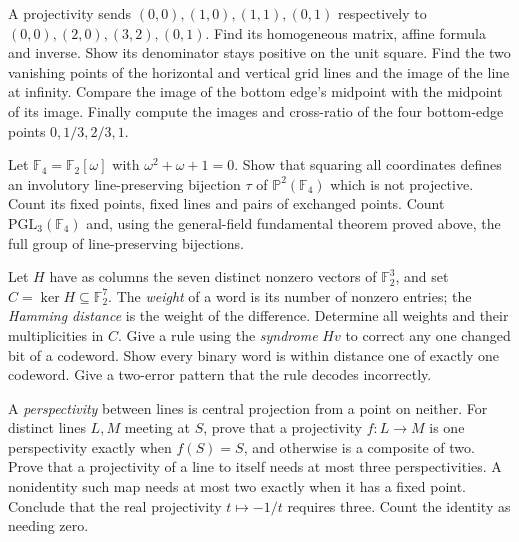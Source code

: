 \begin{exercise}[$\star\star$]\label{ex:v9-keystone-calibration}
A projectivity sends $(0,0),(1,0),(1,1),(0,1)$ respectively to $(0,0),(2,0),(3,2),(0,1)$. Find its homogeneous matrix, affine formula and inverse. Show its denominator stays positive on the unit square. Find the two vanishing points of the horizontal and vertical grid lines and the image of the line at infinity. Compare the image of the bottom edge's midpoint with the midpoint of its image. Finally compute the images and cross-ratio of the four bottom-edge points $0,1/3,2/3,1$.
\end{exercise}
\begin{exercise}[$\star\star$]\label{ex:v9-frobenius-plane}
Let $\mathbb F_4=\mathbb F_2[\omega]$ with $\omega^2+\omega+1=0$. Show that squaring all coordinates defines an involutory line-preserving bijection $\tau$ of $\mathbb P^2(\mathbb F_4)$ which is not projective. Count its fixed points, fixed lines and pairs of exchanged points. Count $\mathrm{PGL}_3(\mathbb F_4)$ and, using the general-field fundamental theorem proved above, the full group of line-preserving bijections.
\end{exercise}
\begin{exercise}[$\star\star$]\label{ex:v9-hamming-plane}
Let $H$ have as columns the seven distinct nonzero vectors of $\mathbb F_2^3$, and set $C=\ker H\subseteq\mathbb F_2^7$. The \emph{weight} of a word is its number of nonzero entries; the \emph{Hamming distance} is the weight of the difference. Determine all weights and their multiplicities in $C$. Give a rule using the \emph{syndrome} $Hv$ to correct any one changed bit of a codeword. Show every binary word is within distance one of exactly one codeword. Give a two-error pattern that the rule decodes incorrectly.
\end{exercise}
\begin{exercise}[$\star\star\star$]\label{ex:v9-factor-perspectivities}
A \emph{perspectivity} between lines is central projection from a point on neither. For distinct lines $L,M$ meeting at $S$, prove that a projectivity $f:L\to M$ is one perspectivity exactly when $f(S)=S$, and otherwise is a composite of two. Prove that a projectivity of a line to itself needs at most three perspectivities. A nonidentity such map needs at most two exactly when it has a fixed point. Conclude that the real projectivity $t\mapsto-1/t$ requires three. Count the identity as needing zero.
\end{exercise}

